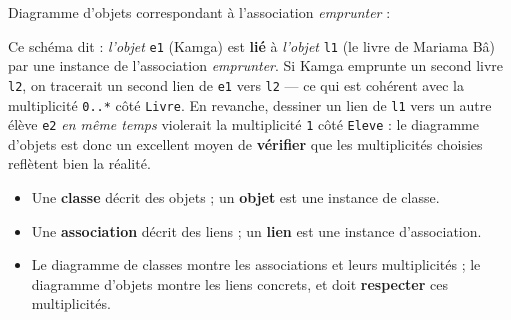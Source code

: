 \documentclass[11pt]{article}
\begin{document}
\begin{exemplebox}
Diagramme d'objets correspondant à l'association \emph{emprunter} :

\begin{center}
\end{center}

Ce schéma dit : \emph{l'objet} \texttt{e1} (Kamga) est \textbf{lié} à \emph{l'objet} \texttt{l1} (le livre de Mariama Bâ) par une instance de l'association \emph{emprunter}. Si Kamga emprunte un second livre \texttt{l2}, on tracerait un second lien de \texttt{e1} vers \texttt{l2} — ce qui est cohérent avec la multiplicité \texttt{0..*} côté \texttt{Livre}. En revanche, dessiner un lien de \texttt{l1} vers un autre élève \texttt{e2} \emph{en même temps} violerait la multiplicité \texttt{1} côté \texttt{Eleve} : le diagramme d'objets est donc un excellent moyen de \textbf{vérifier} que les multiplicités choisies reflètent bien la réalité.
\end{exemplebox}

\begin{aretenir}
\begin{itemize}
\item Une \textbf{classe} décrit des objets ; un \textbf{objet} est une instance de classe.
\item Une \textbf{association} décrit des liens ; un \textbf{lien} est une instance d'association.
\item Le diagramme de classes montre les associations et leurs multiplicités ; le diagramme d'objets montre les liens concrets, et doit \textbf{respecter} ces multiplicités.
\end{itemize}
\end{aretenir}
\end{document}
